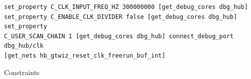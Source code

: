\documentclass[oneside]{discothesis}
\begin{document}
\begin{listing}
\begin{verbatim}
set_property C_CLK_INPUT_FREQ_HZ 300000000 [get_debug_cores dbg_hub]
set_property C_ENABLE_CLK_DIVIDER false [get_debug_cores dbg_hub] set_property
C_USER_SCAN_CHAIN 1 [get_debug_cores dbg_hub] connect_debug_port dbg_hub/clk
[get_nets hb_gtwiz_reset_clk_freerun_buf_int]
\end{verbatim}
\caption{Constraints}
\label{lst:constraints}
\end{listing}
\end{document}
